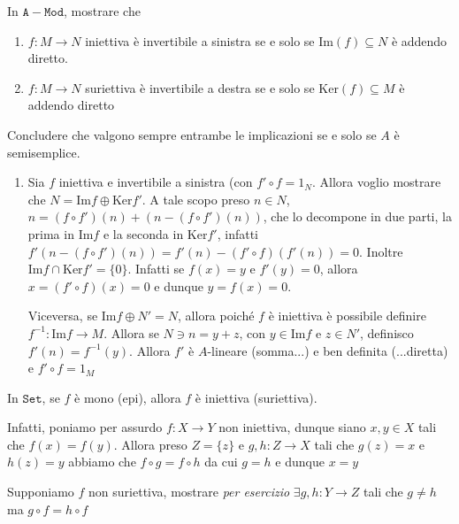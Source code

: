 \begin{eser}{}
    In \(\mathtt{A-Mod}\), mostrare che
\begin{enumerate}[label = \alph*.]
    \item \(f : M\to N\) iniettiva è invertibile a
    sinistra se e solo se \(\mathrm{Im}{(f)} \subseteq N \) è addendo diretto.
    \item \(f : M \to N\) suriettiva è invertibile a destra se e solo se
    \(\mathrm{Ker}{(f)} \subseteq M \) è addendo diretto
\end{enumerate}

    Concludere che valgono sempre entrambe le implicazioni se e solo se \(A\) è
    semisemplice.

    \tcblower

\begin{enumerate}[label = \alph*.]
    \item Sia \(f\) iniettiva e invertibile a sinistra (con \(f' \circ f =
        1_N\). Allora voglio mostrare che \(N = \mathrm{Im}f \oplus
        \mathrm{Ker}f'\). A tale scopo preso \(n \in N\), \(n = {(f \circ
        f')}{(n)} + {(n - {(f \circ f')}{(n)})}\), che lo decompone in due
        parti, la prima in \(\mathrm{Im}f\) e la seconda in \(\mathrm{Ker}f'\),
        infatti \(f'{(n - {(f \circ f')}{(n)})} = f'{(n)} - {(f' \circ
        f)}{(f'{(n)})} = 0\). Inoltre \(\mathrm{Im}f \cap \mathrm{Ker}f' = \{0\}
        \). Infatti se \(f{(x)} = y\) e \(f'{(y)} = 0\), allora \(x = {(f' \circ
        f)}{(x)} = 0\) e dunque \(y = f{(x)} = 0\).

        Viceversa, se \(\mathrm{Im}f \oplus N' = N\), allora poiché \(f\) è
        iniettiva è possibile definire \(f^{-1} : \mathrm{Im}f \to M\). Allora
        se \(N \ni n = y + z\), con \(y \in \mathrm{Im}f\) e \(z \in N'\),
        definisco \(f'{(n)} = f^{-1}{(y)}\). Allora \(f'\) è \(A\)-lineare
        (somma...) e ben definita (...diretta) e \(f' \circ f = 1_M\) 
\end{enumerate}


\end{eser}

\begin{example}{}
    In \(\mathtt{Set}\), se \(f\) è mono (epi), allora \(f\) è iniettiva
    (suriettiva).

    Infatti, poniamo per assurdo \(f : X \to Y\) non iniettiva, dunque siano \(x, y \in X\) tali che \(f{(x)} = f{(y)}\). Allora preso \(Z = \{z\} \) e \(g, h : Z\to X\) tali che \(g
    {(z)} = x\) e \(h{(z)} = y\) abbiamo che \(f \circ g = f \circ h\) da cui \(g = h\) e dunque \(x = y\) 

    Supponiamo \(f\) non suriettiva, mostrare \emph{per esercizio} \(\exists g, h : Y \to Z\) tali che
    \(g \neq h\) ma \(g \circ f = h \circ f\) 
\end{example}

